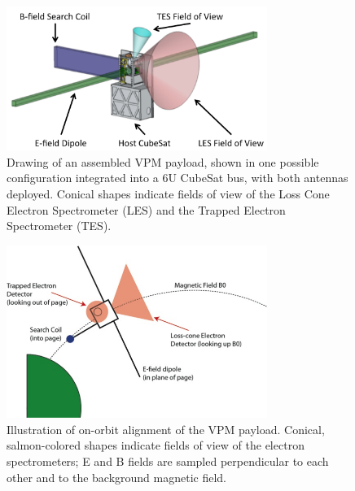 \begin{figure}[t]
\begin{center}
\includegraphics[width=20pc]{figures/vpm_figures/payload_figure_annotated.png}

\caption[Drawing of the assembled VPM payload on a 6U cubesat bus]{Drawing of an assembled VPM payload, shown in one possible configuration integrated into a 6U CubeSat bus, with both antennas deployed. Conical shapes indicate fields of view of the Loss Cone Electron Spectrometer (LES) and the Trapped Electron Spectrometer (TES). }
\label{fig:VPM_full}
\end{center}
\end{figure}

\begin{figure}[t]
\begin{center}
\includegraphics[width=20pc]{figures/vpm_figures/operations.png}

\caption[On-orbit alignment of the VPM payload]{Illustration of on-orbit alignment of the VPM payload. Conical, salmon-colored shapes indicate fields of view of the electron spectrometers; E and B fields are sampled perpendicular to each other and to the background magnetic field.}
\label{fig:operations}
\end{center}
\end{figure}




